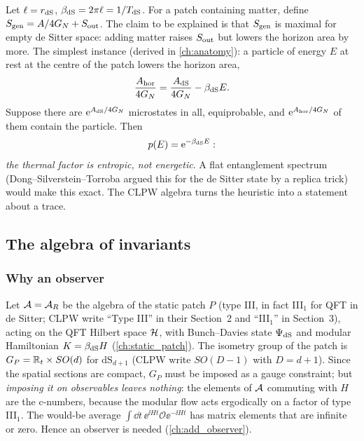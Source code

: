 Let $\ell=r_{\rm dS}$, $\beta_{\rm dS}=2\pi\ell=1/T_{\rm dS}$. For a patch containing matter, define $S_{\mathrm{gen}}=A/4G_N+S_{\rm out}$. The claim to be explained is that $S_{\mathrm{gen}}$ is maximal for empty de Sitter space: adding matter raises $S_{\rm out}$ but lowers the horizon area by more. The simplest instance (derived in \cref{ch:anatomy}): a particle of energy $E$ at rest at the centre of the patch lowers the horizon area,
\begin{equation}
\frac{A_{\rm hor}}{4G_N}=\frac{A_{\rm dS}}{4G_N}-\beta_{\rm dS}E.\label{eq:areashift}
\end{equation}
Suppose there are $\mathrm{e}^{A_{\rm dS}/4G_N}$ microstates in all, equiprobable, and $\mathrm{e}^{A_{\rm hor}/4G_N}$ of them contain the particle. Then
\begin{equation}
p(E)=\mathrm{e}^{-\beta_{\rm dS}E}:\label{eq:entropicp}
\end{equation}
\emph{the thermal factor is entropic, not energetic}. A flat entanglement spectrum (Dong--Silverstein--Torroba \cite{DST2018} argued this for the de Sitter state by a replica trick) would make this exact. The CLPW algebra turns the heuristic into a statement about a trace.

\subsection{The algebra of invariants}

\subsubsection{Why an observer}
Let $\mathcal{A}=\mathcal{A}_R$ be the algebra of the static patch $P$ (type III, in fact III$_1$ for QFT in de Sitter; CLPW write ``Type III'' in their Section~2 and ``III$_1$'' in Section~3), acting on the QFT Hilbert space $\mathcal{H}$, with Bunch--Davies state $\Psi_{\rm dS}$ and modular Hamiltonian $K=\beta_{\rm dS}H$ (\cref{ch:static_patch}). The isometry group of the patch is $G_P=\mathbb{R}_t\times SO(d)$ for $\mathrm{dS}_{d+1}$ (CLPW write $SO(D-1)$ with $D=d+1$). Since the spatial sections are compact, $G_P$ must be imposed as a gauge constraint; but \emph{imposing it on observables leaves nothing}: the elements of $\mathcal{A}$ commuting with $H$ are the c-numbers, because the modular flow acts ergodically on a factor of type III$_1$. The would-be average $\int\dd t\,\ee^{\ii Ht}\mathcal O\ee^{-\ii Ht}$ has matrix elements that are infinite or zero. Hence an observer is needed (\cref{ch:add_observer}).

